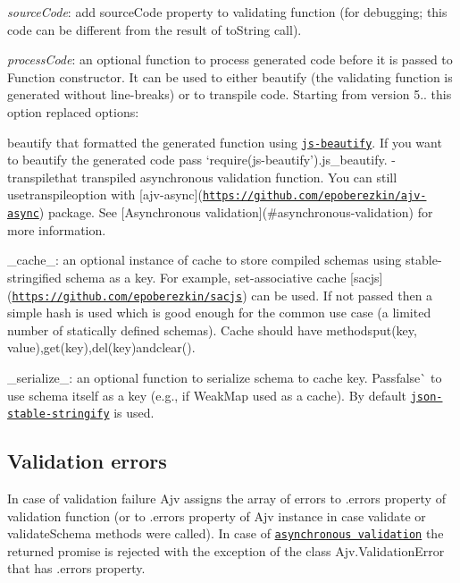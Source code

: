 \begin{DoxyItemize}
\item {\itshape source\+Code}\+: add {\ttfamily source\+Code} property to validating function (for debugging; this code can be different from the result of to\+String call).
\item {\itshape process\+Code}\+: an optional function to process generated code before it is passed to Function constructor. It can be used to either beautify (the validating function is generated without line-\/breaks) or to transpile code. Starting from version 5.. this option replaced options\+:
\begin{DoxyItemize}
\item {\ttfamily beautify} that formatted the generated function using \href{https://github.com/beautify-web/js-beautify}{\tt js-\/beautify}. If you want to beautify the generated code pass `require(\textquotesingle{}js-\/beautify').js\+\_\+beautify{\ttfamily . -\/}transpile{\ttfamily that transpiled asynchronous validation function. You can still use}transpile{\ttfamily option with \mbox{[}ajv-\/async\mbox{]}(\href{https://github.com/epoberezkin/ajv-async}{\tt https\+://github.\+com/epoberezkin/ajv-\/async}) package. See \mbox{[}Asynchronous validation\mbox{]}(\#asynchronous-\/validation) for more information.}
\end{DoxyItemize}
\item {\ttfamily \+\_\+cache\+\_\+\+: an optional instance of cache to store compiled schemas using stable-\/stringified schema as a key. For example, set-\/associative cache \mbox{[}sacjs\mbox{]}(\href{https://github.com/epoberezkin/sacjs}{\tt https\+://github.\+com/epoberezkin/sacjs}) can be used. If not passed then a simple hash is used which is good enough for the common use case (a limited number of statically defined schemas). Cache should have methods}put(key, value){\ttfamily ,}get(key){\ttfamily ,}del(key){\ttfamily and}clear(){\ttfamily .}
\item {\ttfamily \+\_\+serialize\+\_\+\+: an optional function to serialize schema to cache key. Pass}false\`{} to use schema itself as a key (e.\+g., if Weak\+Map used as a cache). By default \href{https://github.com/substack/json-stable-stringify}{\tt json-\/stable-\/stringify} is used.
\end{DoxyItemize}

\subsection*{Validation errors}

In case of validation failure Ajv assigns the array of errors to {\ttfamily .errors} property of validation function (or to {\ttfamily .errors} property of Ajv instance in case {\ttfamily validate} or {\ttfamily validate\+Schema} methods were called). In case of \href{#asynchronous-validation}{\tt asynchronous validation} the returned promise is rejected with the exception of the class {\ttfamily Ajv.\+Validation\+Error} that has {\ttfamily .errors} property.

